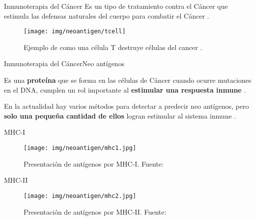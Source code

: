 \documentclass[10pt]{beamer}
\newcommand{\1}{
	\setbeamertemplate{background}{
		\texttt{[image: img/1]}
		\tikz[overlay] \fill[fill opacity=0.75,fill=white] (0,0) rectangle (-\paperwidth,\paperheight);
	}
}
\begin{document}
\begin{frame}{Inmunoterapia del Cáncer}{}		
	Es un tipo de tratamiento contra el Cáncer que estimula las defensas naturales del cuerpo para combatir el Cáncer \cite{inmunoterapy2022}.
		
	\begin{figure}
		\texttt{[image: img/neoantigen/tcell]}
		\caption{Ejemplo de como una célula T destruye células del cancer \cite{nortshore2022}.}
	\end{figure}		
\end{frame}

\begin{frame}{Inmunoterapia del Cáncer}{Neo antígenos}		
	\begin{block}{}
		Es una \textbf{proteína} que se forma en las células de Cáncer cuando ocurre mutaciones en el DNA, cumplen un rol importante al \textbf{estimular una respuesta inmune} \cite{NCIdictionary2022, borden2022cancer}.
	\end{block} 
	\begin{block}{}
		En la actualidad hay varios métodos para detectar a predecir neo antígenos, pero \textbf{solo una pequeña cantidad de ellos} logran estimular al sistema inmune \cite{chen2021challenges, hao2021improvement}.
	\end{block}
\end{frame}

\begin{frame}{MHC-I}{}		
	\begin{figure}[H]
		\centering
		\texttt{[image: img/neoantigen/mhc1.jpg]}
		\caption{Presentación de antígenos por MHC-I. Fuente: \cite{zhang2019application}}
		\label{fig:mhc1}
	\end{figure}	
\end{frame}

\begin{frame}{MHC-II}{}		
	\begin{figure}[H]
		\centering
		\texttt{[image: img/neoantigen/mhc2.jpg]}
		\caption{Presentación de antígenos por MHC-II. Fuente: \cite{zhang2019application}}
		\label{fig:mhc2}
	\end{figure}	
\end{frame}
\end{document}
